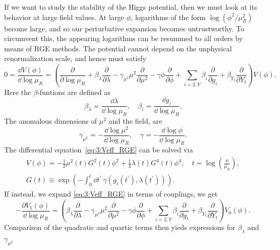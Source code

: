 If we want to study the stability of the Higgs potential, then we must look at its behavior at large field values. At large $\phi$, logarithms of the form $\log (\phi^2/\mu_R^2)$ become large, and so our perturbative expansion becomes untrustworthy. To circumvent this, the appearing logarithms can be resummed to all orders by means of \acs{RGE} methods. The potential cannot depend on the unphysical renormalization scale, and hence must satisfy
\begin{equation}
0 = \frac{\dd V(\phi)}{\dd \log \mu_R} = \left( \frac{\partial}{\partial \log \mu_R} + \beta_\lambda \frac{\partial}{\partial \lambda} - \gamma_{\mu^2} \mu^2 \frac{\partial}{\partial \mu^2} - \gamma \phi \frac{\partial}{\partial \phi} + \sum_{i= 2, Y} \beta_i \frac{\partial }{\partial g_i} + \beta_{Y_t} \frac{\partial }{\partial Y_t} \right) V(\phi).
\label{eq:3:Veff_RGE}
\end{equation}
Here the $\beta$-funtions are defined as
\begin{equation}
\beta_\lambda = \frac{\dd \lambda}{\dd \log \mu_R}, \quad \beta_i = \frac{\dd g_i}{\dd \log \mu_R}.
\end{equation}
The anomalous dimensions of $\mu^2$ and the field, are
\begin{equation}
\gamma_{\mu^2} = - \frac{\dd \log \mu^2}{\dd \log \mu_R}, \quad \gamma = - \frac{\dd \log \phi}{\dd \log \mu_R}.
\end{equation}
The differential equation~\eqref{eq:3:Veff_RGE} can be solved via
\begin{equation}
\begin{gathered}
V (\phi) = -\frac{1}{2} \mu^2(t) G^2(t) \phi^2 + \frac{1}{4} \lambda(t) G^4(t) \phi^4, \quad t = \log\left( \frac{\phi}{\mu_R} \right), \\
G(t) \equiv \exp\! \left(- \int_0^t \dd t^\prime \ \gamma(g_i (t^\prime), \lambda (t^\prime)) \right).
\end{gathered}
\label{eq:3:Veff_solution}
\end{equation}
If instead, we expand \eqref{eq:3:Veff_RGE} in terms of couplings, we get
\begin{equation}
-\frac{\partial V_1(\phi)}{\dd \log \mu_R} = \left( \beta_\lambda \frac{\partial}{\partial \lambda} - \gamma_{\mu^2} \mu^2 \frac{\partial}{\partial \mu^2} - \gamma \phi \frac{\partial}{\partial \phi} + \sum_{i= 2, Y} \beta_i \frac{\partial }{\partial g_i} + \beta_{Y_t} \frac{\partial }{\partial Y_t} \right) V_0(\phi).
\end{equation}
Comparison of the quadratic and quartic terms then yieds expressions for $\beta_\lambda$ and $\gamma_{\mu^2}$
